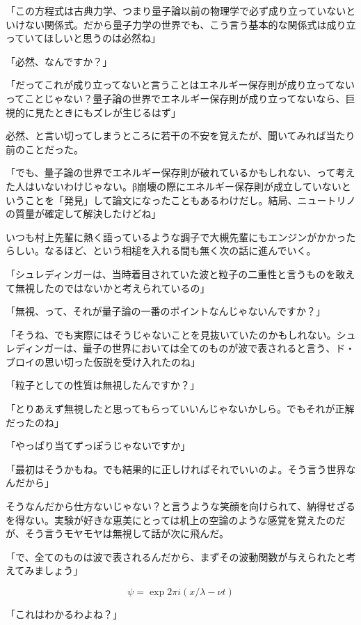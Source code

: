 \documentclass[a4paper,dvipdfmx,12pt]{jsarticle}
\begin{document}
「この方程式は古典力学、つまり量子論以前の物理学で必ず成り立っていないといけない関係式。だから量子力学の世界でも、こう言う基本的な関係式は成り立っていてほしいと思うのは必然ね」

「必然、なんですか？」


「だってこれが成り立ってないと言うことはエネルギー保存則が成り立ってないってことじゃない？量子論の世界でエネルギー保存則が成り立ってないなら、巨視的に見たときにもズレが生じるはず」


必然、と言い切ってしまうところに若干の不安を覚えたが、聞いてみれば当たり前のことだった。

「でも、量子論の世界でエネルギー保存則が破れているかもしれない、って考えた人はいないわけじゃない。β崩壊の際にエネルギー保存則が成立していないということを「発見」して論文になったこともあるわけだし。結局、ニュートリノの質量が確定して解決したけどね」

いつも村上先輩に熱く語っているような調子で大槻先輩にもエンジンがかかったらしい。なるほど、という相槌を入れる間も無く次の話に進んでいく。

「シュレディンガーは、当時着目されていた波と粒子の二重性と言うものを敢えて無視したのではないかと考えられているの」

「無視、って、それが量子論の一番のポイントなんじゃないんですか？」

「そうね、でも実際にはそうじゃないことを見抜いていたのかもしれない。シュレディンガーは、量子の世界においては全てのものが波で表されると言う、ド・ブロイの思い切った仮説を受け入れたのね」

「粒子としての性質は無視したんですか？」

「とりあえず無視したと思ってもらっていいんじゃないかしら。でもそれが正解だったのね」

「やっぱり当てずっぽうじゃないですか」

「最初はそうかもね。でも結果的に正しければそれでいいのよ。そう言う世界なんだから」

そうなんだから仕方ないじゃない？と言うような笑顔を向けられて、納得せざるを得ない。実験が好きな恵美にとっては机上の空論のような感覚を覚えたのだが、そう言うモヤモヤは無視して話が次に飛んだ。

「で、全てのものは波で表されるんだから、まずその波動関数が与えられたと考えてみましょう」

\begin{equation}
\psi=\exp{2\pi i(x/\lambda-\nu t)}
\end{equation}

「これはわかるわよね？」
\end{document}
